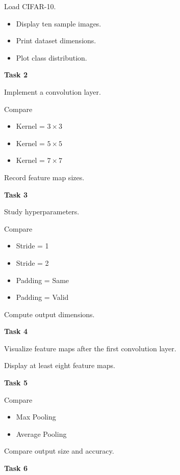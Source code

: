\documentclass[11pt]{article}
\begin{document}
Load CIFAR-10.

\begin{itemize}
\item Display ten sample images.
\item Print dataset dimensions.
\item Plot class distribution.
\end{itemize}

\bigskip

\textbf{Task 2}

Implement a convolution layer.

Compare

\begin{itemize}
\item Kernel = $3\times3$
\item Kernel = $5\times5$
\item Kernel = $7\times7$
\end{itemize}

Record feature map sizes.

\bigskip

\textbf{Task 3}

Study hyperparameters.

Compare

\begin{itemize}
\item Stride = 1
\item Stride = 2
\item Padding = Same
\item Padding = Valid
\end{itemize}

Compute output dimensions.

\bigskip

\textbf{Task 4}

Visualize feature maps after the first convolution layer.

Display at least eight feature maps.

\bigskip

\textbf{Task 5}

Compare

\begin{itemize}
\item Max Pooling
\item Average Pooling
\end{itemize}

Compare output size and accuracy.

\bigskip

\textbf{Task 6}
\end{document}
